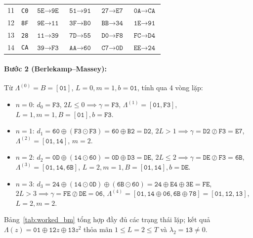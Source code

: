 \begin{table}[!htb]
\begin{tabular}{@{} c c c c c c @{}}
11 & \texttt{C0} & $\texttt{5E} \to \texttt{9E}$ & $\texttt{51} \to \texttt{91}$ & $\texttt{27} \to \texttt{E7}$ & $\texttt{0A} \to \texttt{CA}$ \\
12 & \texttt{8F} & $\texttt{9E} \to \texttt{11}$ & $\texttt{3F} \to \texttt{B0}$ & $\texttt{BB} \to \texttt{34}$ & $\texttt{1E} \to \texttt{91}$ \\
13 & \texttt{28} & $\texttt{11} \to \texttt{39}$ & $\texttt{7D} \to \texttt{55}$ & $\texttt{D0} \to \texttt{F8}$ & $\texttt{FC} \to \texttt{D4}$ \\
14 & \texttt{CA} & $\texttt{39} \to \mathbf{\texttt{F3}}$ & $\texttt{AA} \to \mathbf{\texttt{60}}$ & $\texttt{C7} \to \mathbf{\texttt{0D}}$ & $\texttt{EE} \to \mathbf{\texttt{24}}$ \\
\bottomrule
\end{tabular}
\end{table}

\paragraph{Bước 2 (Berlekamp--Massey):} Từ $\Lambda^{(0)} = B = [\texttt{01}]$, $L=0, m=1, b=\texttt{01}$, tính qua 4 vòng lặp:
\begin{itemize}
    \item $n=0$: $d_0 = \texttt{F3}$, $2L \le 0 \implies \gamma = \texttt{F3}$, $\Lambda^{(1)} = [\texttt{01}, \texttt{F3}]$, $L=1, m=1, B=[\texttt{01}], b=\texttt{F3}$.
    \item $n=1$: $d_1 = \texttt{60} \oplus (\texttt{F3}\odot\texttt{F3}) = \texttt{60} \oplus \texttt{B2} = \texttt{D2}$, $2L > 1 \implies \gamma = \texttt{D2}\oslash\texttt{F3} = \texttt{E7}$, $\Lambda^{(2)} = [\texttt{01}, \texttt{14}]$, $m=2$.
    \item $n=2$: $d_2 = \texttt{0D} \oplus (\texttt{14}\odot\texttt{60}) = \texttt{0D} \oplus \texttt{D3} = \texttt{DE}$, $2L \le 2 \implies \gamma = \texttt{DE}\oslash\texttt{F3} = \texttt{6B}$, $\Lambda^{(3)} = [\texttt{01}, \texttt{14}, \texttt{6B}]$, $L=2, m=1, B=[\texttt{01}, \texttt{14}], b=\texttt{DE}$.
    \item $n=3$: $d_3 = \texttt{24} \oplus (\texttt{14}\odot\texttt{0D}) \oplus (\texttt{6B}\odot\texttt{60}) = \texttt{24} \oplus \texttt{E4} \oplus \texttt{3E} = \texttt{FE}$, $2L > 3 \implies \gamma = \texttt{FE}\oslash\texttt{DE} = \texttt{06}$, $\Lambda^{(4)} = [\texttt{01}, \texttt{14}\oplus\texttt{06}, \texttt{6B}\oplus\texttt{78}] = [\texttt{01}, \texttt{12}, \texttt{13}]$, $L=2, m=2$.
\end{itemize}
Bảng~\ref{tab:worked_bm} tổng hợp đầy đủ các trạng thái lặp; kết quả $\Lambda(z) = \texttt{01} \oplus \texttt{12}z \oplus \texttt{13}z^2$ thỏa mãn $1 \le L = 2 \le T$ và $\lambda_2 = \texttt{13} \neq 0$.

